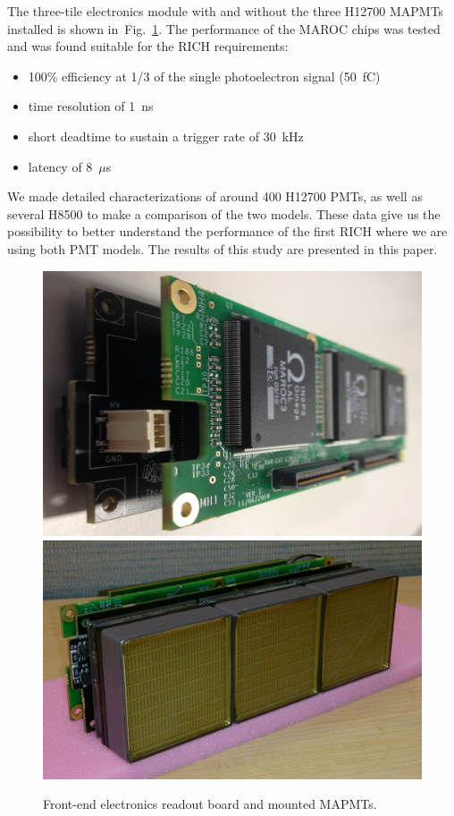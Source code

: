 The three-tile electronics module with and without the three H12700 MAPMTs installed is shown in~Fig.~\ref{fig:feboards}.
The performance of the MAROC chips was tested and was found suitable for the RICH requirements:
\begin{itemize}
	\item 100\% efficiency at 1/3 of the single photoelectron signal (50~fC)
	\item time resolution of 1~ns
	\item short deadtime to sustain a trigger rate of 30~kHz
	\item latency of 8~$\mu$s
\end{itemize}
We made detailed characterizations of around 400 H12700 PMTs, as well as several H8500  to make a comparison of the two models.
These data give us the possibility to better understand the performance of the first RICH where we are using both PMT models.
The results of this study are presented in this paper.

\begin{figure}[htb]
  \centering
  \includegraphics[width=0.8\linewidth]{figures/fe1.pdf}
  \includegraphics[width=0.8\linewidth]{figures/frontendPMT.pdf}
  \caption{Front-end electronics readout board and mounted MAPMTs.}
  \label{fig:feboards}
\end{figure}






